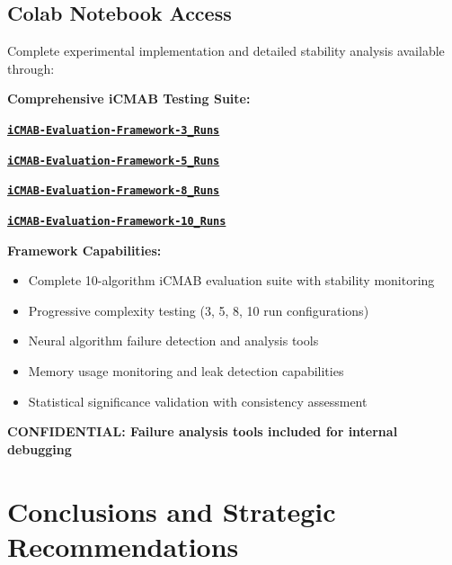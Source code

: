 \documentclass[12pt,a4paper]{article}
\newcommand{\critical}[1]{\textcolor{criticalcolor}{\textbf{#1}}}
\newcommand{\colab}[1]{\textcolor{colabcolor}{\textbf{#1}}}
\begin{document}
\subsection{Colab Notebook Access}

Complete experimental implementation and detailed stability analysis available through:

\begin{tcolorbox}[colback=colabcolor!20,colframe=colabcolor,title=\textbf{iCMAB Evaluation Framework Access}]

\begin{center}
\textbf{Comprehensive iCMAB Testing Suite:}
\vspace{0.3cm}

\href{https://colab.research.google.com/drive/PLACEHOLDER_3_RUNS}{\colab{\texttt{iCMAB-Evaluation-Framework-3\_Runs}}}

\href{https://colab.research.google.com/drive/PLACEHOLDER_5_RUNS}{\colab{\texttt{iCMAB-Evaluation-Framework-5\_Runs}}}

\href{https://colab.research.google.com/drive/PLACEHOLDER_8_RUNS}{\colab{\texttt{iCMAB-Evaluation-Framework-8\_Runs}}}

\href{https://colab.research.google.com/drive/PLACEHOLDER_10_RUNS}{\colab{\texttt{iCMAB-Evaluation-Framework-10\_Runs}}}

\vspace{0.3cm}
\textbf{Framework Capabilities:}
\begin{itemize}
\item Complete 10-algorithm iCMAB evaluation suite with stability monitoring
\item Progressive complexity testing (3, 5, 8, 10 run configurations)
\item Neural algorithm failure detection and analysis tools
\item Memory usage monitoring and leak detection capabilities
\item Statistical significance validation with consistency assessment
\end{itemize}

\critical{\textbf{CONFIDENTIAL:} Failure analysis tools included for internal debugging}
\end{center}
\end{tcolorbox}

\section{Conclusions and Strategic Recommendations}
\end{document}
